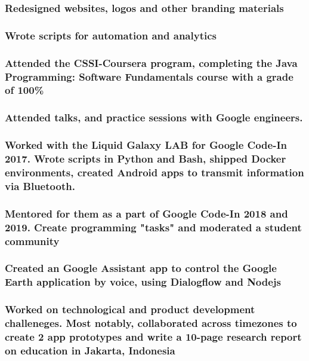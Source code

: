 \documentclass[a4paper]{resume}
\begin{document}
\subsubsection{Redesigned websites, logos and other branding materials}
\subsubsection{Wrote scripts for automation and analytics}

\subsubsection{Attended the CSSI-Coursera program, completing the Java Programming: Software Fundamentals course with a grade of 100\%}
\subsubsection{Attended talks, and practice sessions with Google engineers.}

\subsubsection{Worked with the Liquid Galaxy LAB for Google Code-In 2017. Wrote scripts in Python and Bash, shipped Docker environments, created Android apps to transmit information via Bluetooth.}
\subsubsection{Mentored for them as a part of Google Code-In 2018 and 2019. Create programming "tasks" and moderated a student community}
\subsubsection{Created an Google Assistant app to control the Google Earth application by voice, using Dialogflow and Nodejs}

\subsubsection{Worked on technological and product development challeneges. Most notably, collaborated across timezones to create 2 app prototypes and write a 10-page research report on education in Jakarta, Indonesia}
\end{document}
